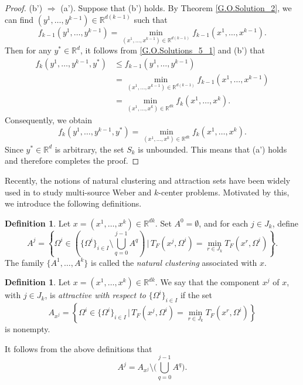 \documentclass[sn-mathphys-num]{sn-jnl}%
\theoremstyle{definition}
\newtheorem{definition}[theorem]{Definition}
\begin{document}
\begin{proof}
    
	(b') $\Rightarrow$ (a'). Suppose that (b') holds. By Theorem \ref{G.O.Solution_2},
	we can find $(y^1,\dots,y^{k-1})\in \mathbb{R}^{d(k-1)}$ such that
	\[
	f_{k-1}\left(y^1,\dots,y^{k-1}\right)
	=\min_{(x^1,\dots,x^{k-1})\in\mathbb{R}^{d(k-1)}}f_{k-1}\left(x^1,\dots,x^{k-1}\right).
	\]
	Then for any $y^* \in \mathbb{R}^d$, it follows from \eqref{G.O.Solutions_5_1} and (b') that
	\[
	\begin{aligned}
		f_k\left(y^1,\dots,y^{k-1},y^*\right)
		&\leq f_{k-1}\left(y^1,\dots,y^{k-1} \right)\\&=\min_{(x^1,\dots,x^{k-1})\in\mathbb{R}^{d(k-1)}}f_{k-1}\left(x^1,\dots,x^{k-1}\right)\\
		&=\min_{(x^1,\dots,x^{k})\in\mathbb{R}^{dk}}f_k\left(x^1,\dots,x^k\right).
	\end{aligned}
	\]
	Consequently, we obtain
	\[
	f_k\left(y^1,\dots,y^{k-1},y^*\right)
	=\min_{(x^1,\dots,x^{k})\in\mathbb{R}^{dk}}f_k\left(x^1,\dots,x^k\right).
	\]
	Since $y^*\in \mathbb{R}^d$ is arbitrary, the set $S_k$ is unbounded. This means that (a') holds and therefore completes the proof.
\end{proof}

Recently, the notions of natural clustering and attraction sets have been widely used in \cite{cuong2020qualitative,cuong2023global,CTWYOptim,Cuong2024} 
to study multi-source Weber and $k$-center problems. Motivated by this, we introduce the following definitions.

\begin{definition}
	\label{G.O.Solutions_7}
	Let $x=(x^1,\dots,x^k)\in \mathbb{R}^{dk}$. Set $A^0=\emptyset$, and for each $j\in J_k$, define
	\[
	A^j=\left\{\Omega^i \in \left(\{\Omega^i\}_{i \in I}\setminus\bigcup_{q=0}^{j-1}A^q\right)\,\Bigg|\,
	T_F(x^j,\Omega^i)=\min_{r\in J_k}T_F(x^r,\Omega^i)\right\}.
	\]
	The family $\{A^1,\dots,A^k\}$ is called the \textit{natural clustering} associated with $x$. 
\end{definition}

\begin{definition}
	\label{G.O.Solutions_8}
	Let $x=(x^1,\dots,x^k)\in \mathbb{R}^{dk}$. We say that the component $x^j$ of $x$, with $j\in J_k$, is \textit{attractive with respect to} $\{\Omega^i\}_{i\in I}$ if the set
	\[
	A_{x^j}
	=\left\{\Omega^i \in \{\Omega^i\}_{i \in I}\,\Big|\,
	T_F(x^j,\Omega^i)=\min_{r \in J_k}T_F(x^r,\Omega^i)\right\}
	\]
	is nonempty.
\end{definition}


It follows from the above definitions that
\begin{equation}
\label{A^j_A_x^j_relationship}
A^j= A_{x^j}\setminus\bigg(\bigcup_{q=0}^{j-1} A^q\bigg).
\end{equation}
\end{document}
